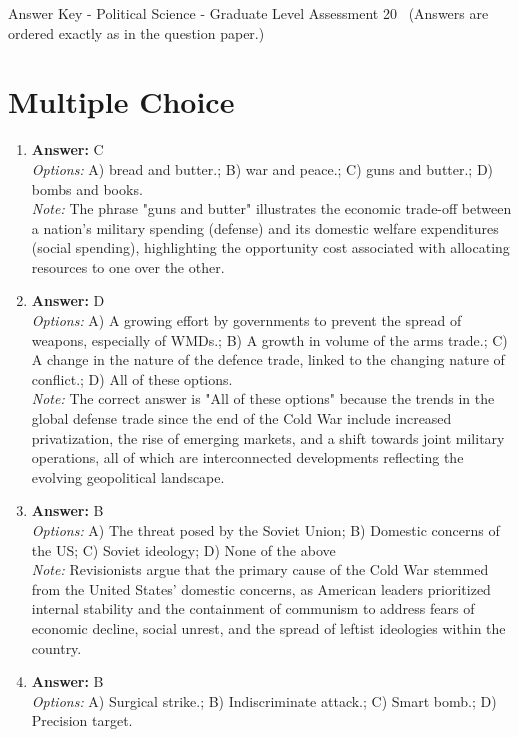 \documentclass[12pt]{article}
\begin{document}
\begin{center}
Answer Key - Political Science - Graduate Level Assessment 20 \
\small (Answers are ordered exactly as in the question paper.)
\end{center}

\section*{Multiple Choice}
\begin{enumerate}[label=\arabic*.]
\item \textbf{Answer:} C
\\ \textit{Options:} A) bread and butter.; B) war and peace.; C) guns and butter.; D) bombs and books.
\\ \textit{Note:} The phrase "guns and butter" illustrates the economic trade-off between a nation's military spending (defense) and its domestic welfare expenditures (social spending), highlighting the opportunity cost associated with allocating resources to one over the other.
\item \textbf{Answer:} D
\\ \textit{Options:} A) A growing effort by governments to prevent the spread of weapons, especially of WMDs.; B) A growth in volume of the arms trade.; C) A change in the nature of the defence trade, linked to the changing nature of conflict.; D) All of these options.
\\ \textit{Note:} The correct answer is "All of these options" because the trends in the global defense trade since the end of the Cold War include increased privatization, the rise of emerging markets, and a shift towards joint military operations, all of which are interconnected developments reflecting the evolving geopolitical landscape.
\item \textbf{Answer:} B
\\ \textit{Options:} A) The threat posed by the Soviet Union; B) Domestic concerns of the US; C) Soviet ideology; D) None of the above
\\ \textit{Note:} Revisionists argue that the primary cause of the Cold War stemmed from the United States' domestic concerns, as American leaders prioritized internal stability and the containment of communism to address fears of economic decline, social unrest, and the spread of leftist ideologies within the country.
\item \textbf{Answer:} B
\\ \textit{Options:} A) Surgical strike.; B) Indiscriminate attack.; C) Smart bomb.; D) Precision target.

\end{enumerate}
\end{document}
